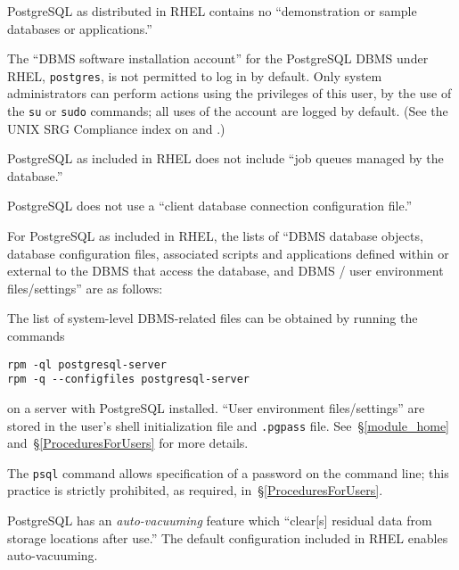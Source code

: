 %
PostgreSQL as distributed in RHEL contains no ``demonstration or sample
databases or applications.''

%
The ``DBMS software installation account'' for the PostgreSQL DBMS under
RHEL, \verb!postgres!, is not permitted to log in by default. Only system
administrators can perform actions using the privileges of this user, by
the use of the \verb!su! or \verb!sudo! commands; all uses of the account
are logged by default. (See the UNIX SRG Compliance index on
 and .)

%
PostgreSQL as included in RHEL does not include ``job queues managed by
the database.''

%
PostgreSQL does not use a ``client database connection configuration
file.''

%
For PostgreSQL as included in RHEL, the lists of ``DBMS database
objects, database configuration files, associated scripts and applications
defined within or external to the DBMS that access the database, and DBMS
/ user environment files/settings'' are as follows:

The list of system-level DBMS-related files can be obtained by running the
commands

\begin{verbatim}
rpm -ql postgresql-server
rpm -q --configfiles postgresql-server
\end{verbatim}

on a server with PostgreSQL installed. ``User environment files/settings''
are stored in the user's shell initialization file and \verb!.pgpass!
file. See~\S\ref{module_home} and~\S\ref{ProceduresForUsers} for more
details.

%
The \verb!psql! command allows specification of a password on the command
line; this practice is strictly prohibited, as required,
in~\S\ref{ProceduresForUsers}.

%
PostgreSQL has an \emph{auto-vacuuming} feature which ``clear[s] residual
data from storage locations after use.'' The default configuration
included in RHEL enables auto-vacuuming.


